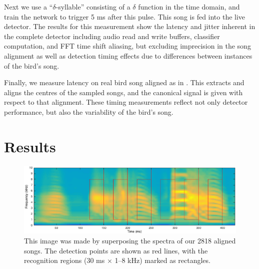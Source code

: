 \documentclass[10pt,letterpaper]{article}
\begin{document}
Next we use a ``$\delta$-syllable'' consisting
of a $\delta$ function in the time domain, and train the network to
trigger 5 ms after this pulse.  This song is fed into the live detector.  The results for this measurement show
the latency and jitter inherent in the complete detector
including audio read and write buffers, classifier
computation, and FFT time shift aliasing, but excluding imprecision in the song alignment as well as detection timing effects due to differences between instances of the bird's song.

Finally, we measure latency on real bird song aligned as in \cite{Poole2012}.  This extracts and aligns the centres of the sampled songs, and the canonical signal is given with respect to that alignment.  These timing measurements reflect not only detector performance, but also the variability of the bird's song.

\section{Results}
\label{sec:results}

\begin{figure}
  \includegraphics[width=\textwidth]{6syllables}
  \caption{This image was made by superposing the spectra of our 2818 aligned songs.  The detection points are shown as red lines, with the recognition regions (30 ms $\times$ 1--8 kHz) marked as rectangles.}
  \label{fig:song}
\end{figure}
\end{document}
